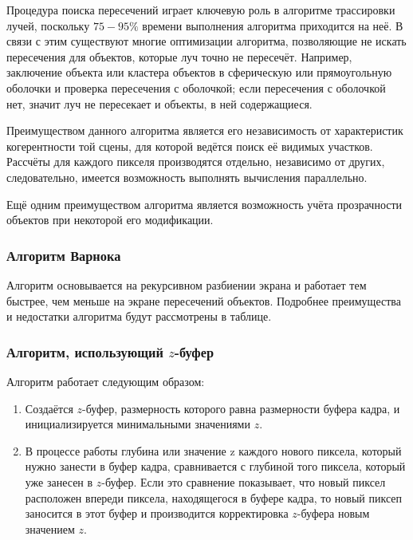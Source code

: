 Процедура поиска пересечений играет ключевую роль в алгоритме трассировки
лучей, поскольку $75-95\%$ времени выполнения алгоритма приходится на неё. В
связи с этим существуют многие оптимизации алгоритма, позволяющие не искать
пересечения для объектов, которые луч точно не пересечёт. Например, заключение
объекта или кластера объектов в сферическую или прямоугольную оболочки и
проверка пересечения с оболочкой; если пересечения с оболочкой нет, значит луч
не пересекает и объекты, в ней содержащиеся. \cite[с.~363]{rogers}

Преимуществом данного алгоритма является его независимость от характеристик
когерентности той сцены, для которой ведётся поиск её видимых участков.
Рассчёты для каждого пикселя производятся отдельно, независимо от других,
следовательно, имеется возможность выполнять вычисления параллельно.

Ещё одним преимуществом алгоритма является возможность учёта прозрачности
объектов при некоторой его модификации.

\subsubsection{Алгоритм Варнока}

Алгоритм основывается на рекурсивном разбиении экрана и работает тем быстрее,
чем меньше на экране пересечений объектов. Подробнее преимущества и недостатки
алгоритма будут рассмотрены в таблице.

\subsubsection{Алгоритм, использующий $z$-буфер}

Алгоритм работает следующим образом:
\begin{enumerate}
    \item Создаётся $z$-буфер, размерность которого равна размерности буфера
        кадра, и инициализируется минимальными значениями $z$.
    \item В процессе работы глубина или значение z каждого нового пиксела,
        который нужно занести в буфер кадра, сравнивается с глубиной того
        пиксела, который уже занесен в $z$-буфер. Если это сравнение
        показывает, что новый пиксел расположен впереди пиксела, находящегося в
        буфере кадра, то новый пиксеп заносится в этот буфер и производится
        корректировка $z$-буфера новым значением $z$. \cite[с.~321]{rogers}
\end{enumerate}

